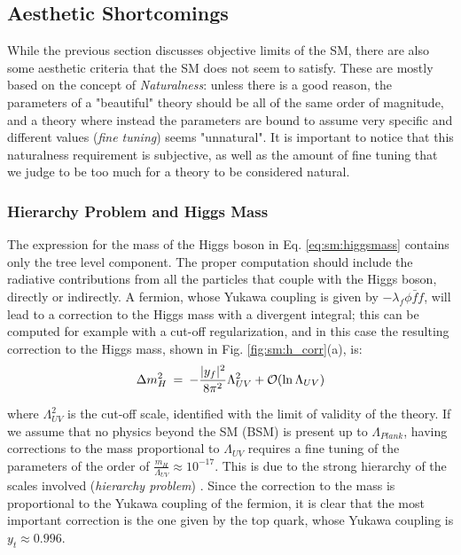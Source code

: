 \subsection{Aesthetic Shortcomings}
\label{sec:sm:aesthetics}

While the previous section discusses objective limits of the SM, there are also some aesthetic criteria that the SM does not seem to satisfy. These are mostly based on the concept of \textit{Naturalness}: unless there is a good reason, the parameters of a "beautiful" theory should be all of the same order of magnitude, and a theory where instead the parameters are bound to assume very specific and different values (\textit{fine tuning}) seems "unnatural". It is important to notice that this naturalness requirement is subjective, as well as the amount of fine tuning that we judge to be too much for a theory to be considered natural.


\subsubsection*{Hierarchy Problem and Higgs Mass}

The expression for the mass of the Higgs boson in Eq. \ref{eq:sm:higgsmass} contains only the tree level component. The proper computation should include the radiative contributions from all the particles that couple with the Higgs boson, directly or indirectly. A fermion, whose Yukawa coupling is given by $-\lambda_f \phi \bar{f} f$, will lead to a correction to the Higgs mass with a divergent integral; this can be computed for example with a cut-off regularization, and in this case the resulting correction to the Higgs mass, shown in Fig. \ref{fig:sm:h_corr}(a), is:
\begin{equation}
\Delta m_H^2 \>=\>  
-{|y_f|^2\over 8 \pi^2} \Lambda_{UV}^2 + \mathcal{O}(\ln \Lambda_{UV} )
\label{eq:divhf}
\end{equation}

where $\Lambda_{UV}^2$ is the cut-off scale, identified with the limit of validity of the theory. If we assume that no physics beyond the SM (BSM) is present up to $\Lambda_{Plank}$, having corrections to the mass proportional to $\Lambda_{UV}$ requires a fine tuning of the parameters of the order of $\frac{m_H}{\Lambda_{UV}} \approx 10^{-17}$. This is due to the strong hierarchy of the scales involved (\textit{hierarchy problem}) \cite{Weinberg:1975gm}\cite{PhysRevD.20.2619}\cite{PhysRevD.14.1667}\cite{tHooft:1979rat}. Since the correction to the mass is proportional to the Yukawa coupling of the fermion, it is clear that the most important correction is the one given by the top quark, whose Yukawa coupling is $y_t \approx 0.996$. 

